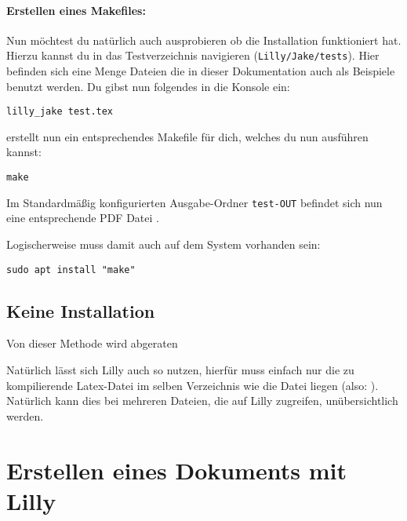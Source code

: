 \paragraph{Erstellen eines Makefiles:}
Nun möchtest du natürlich auch ausprobieren ob die Installation funktioniert hat. 
Hierzu kannst du in das Testverzeichnis navigieren (\verb|Lilly/Jake/tests|). 
Hier befinden sich eine Menge Dateien die in dieser Dokumentation auch als Beispiele benutzt werden.
Du gibst nun folgendes in die Konsole ein: 
\begin{lstlisting}[style=bash]
lilly_jake test.tex
\end{lstlisting}
\Jake erstellt nun ein entsprechendes Makefile für dich, welches du nun ausführen kannst:
\begin{lstlisting}[style=bash]
make 
\end{lstlisting}
Im Standardmäßig konfigurierten Ausgabe-Ordner \verb|test-OUT| befindet sich nun eine entsprechende PDF
Datei \Smiley.\smallskip
\begin{bemerkung}[make]
    Logischerweise muss damit auch  auf dem System vorhanden sein:
\begin{lstlisting}[style=bash]
sudo apt install "make"
\end{lstlisting}
\end{bemerkung}

\subsection{Keine Installation}
\begin{bemerkung}
    Von dieser Methode wird abgeraten
\end{bemerkung}
Natürlich lässt sich Lilly auch so nutzen, hierfür muss einfach nur die zu kompilierende Latex-Datei im selben Verzeichnis wie die Datei  liegen (also: ). Natürlich kann dies bei mehreren Dateien, die auf Lilly zugreifen, unübersichtlich werden.
\clearpage
\section[Erstellen eines Dokuments mit Lilly]{Erstellen eines Dokuments mit Lilly \tiny{}}
